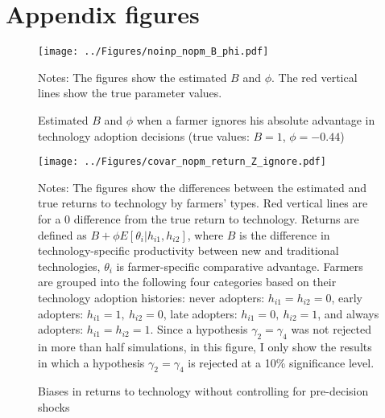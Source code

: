 \documentclass[11pt,letterpaper]{article}
\begin{document}
\clearpage



\appendix

  

\setcounter{figure}{0}
\setcounter{table}{0}
\renewcommand\thefigure{\Alph{section}.\arabic{figure}}
\renewcommand\thetable{\Alph{section}.\arabic{table}}
  
\section{Appendix figures}\label{sec:appendix_figure}

\begin{figure}[H]
  \centering
  \caption{Estimated $B$ and $\phi$ when a farmer ignores his absolute advantage in technology adoption decisions (true values: $B = 1$, $\phi = -0.44$)}
  \texttt{[image: ../Figures/noinp\_nopm\_B\_phi.pdf]}
  \label{fig:noinp_nopm_B_phi}
  \footnotesize
  \begin{tablenotes}
    \item Notes:
      The figures show the estimated $B$ and $\phi$.
      The red vertical lines show the true parameter values.
  \end{tablenotes}
\end{figure}

\begin{figure}[H]
  \centering
  \caption{Biases in returns to technology without controlling for pre-decision shocks}
  \texttt{[image: ../Figures/covar\_nopm\_return\_Z\_ignore.pdf]}
  \label{fig:covar_nopm_return_Z_ignore}
  \footnotesize
  \begin{tablenotes}
    \item Notes:
      The figures show the differences between the estimated and true returns to technology by farmers' types.
      Red vertical lines are for a 0 difference from the true return to technology.
      Returns are defined as $B + \phi E[\theta_i | h_{i1}, h_{i2}]$, where $B$ is the difference in technology-specific productivity between new and traditional technologies, $\theta_i$ is farmer-specific comparative advantage.
      Farmers are grouped into the following four categories based on their technology adoption histories:
      never adopters: $h_{i1} = h_{i2} = 0$, 
      early adopters: $h_{i1} = 1, \ h_{i2} = 0$, 
      late adopters: $h_{i1} = 0, \ h_{i2} = 1$, and
      always adopters: $h_{i1} = h_{i2} = 1$.
      Since a hypothesis $\gamma_2 = \gamma_4$ was not rejected in more than half simulations, in this figure, I only show the results in which a hypothesis $\gamma_2 = \gamma_4$ is rejected at a 10\% significance level.
  \end{tablenotes}
\end{figure}
\end{document}
